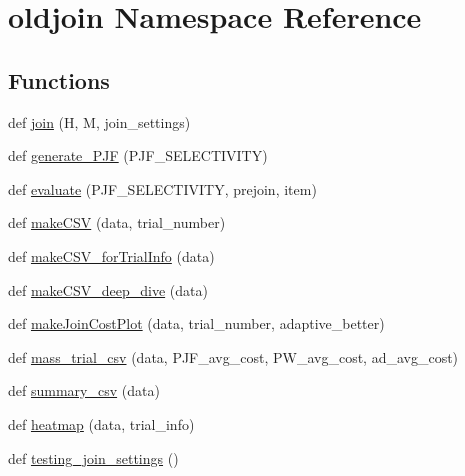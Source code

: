 \hypertarget{namespaceoldjoin}{}\section{oldjoin Namespace Reference}
\label{namespaceoldjoin}
\subsection*{Functions}
\begin{DoxyCompactItemize}
\item 
def \hyperlink{namespaceoldjoin_a8636d8a4fb507de47bd554ef95397533}{join} (H, M, join\+\_\+settings)
\item 
def \hyperlink{namespaceoldjoin_ab07f8db55282bc2c19e5c6ddbdfb820a}{generate\+\_\+\+P\+JF} (P\+J\+F\+\_\+\+S\+E\+L\+E\+C\+T\+I\+V\+I\+TY)
\item 
def \hyperlink{namespaceoldjoin_a8b76cd232f566a0726e27b9e31cdd045}{evaluate} (P\+J\+F\+\_\+\+S\+E\+L\+E\+C\+T\+I\+V\+I\+TY, prejoin, item)
\item 
def \hyperlink{namespaceoldjoin_ad2ce1a61d9eb32b5e5caedc2b9783a17}{make\+C\+SV} (data, trial\+\_\+number)
\item 
def \hyperlink{namespaceoldjoin_a57cd17251a242e4b70c053b463abc920}{make\+C\+S\+V\+\_\+for\+Trial\+Info} (data)
\item 
def \hyperlink{namespaceoldjoin_af8c01b7cf6d0ed355ba3bd5ce60b92fe}{make\+C\+S\+V\+\_\+deep\+\_\+dive} (data)
\item 
def \hyperlink{namespaceoldjoin_acd67830af4aecf91efa9c32ba4ad060a}{make\+Join\+Cost\+Plot} (data, trial\+\_\+number, adaptive\+\_\+better)
\item 
def \hyperlink{namespaceoldjoin_a3c1f060ef4b4343cdc4231fbccfeadb9}{mass\+\_\+trial\+\_\+csv} (data, P\+J\+F\+\_\+avg\+\_\+cost, P\+W\+\_\+avg\+\_\+cost, ad\+\_\+avg\+\_\+cost)
\item 
def \hyperlink{namespaceoldjoin_a7df1afa3b1e7e79e86d2db42e625ec70}{summary\+\_\+csv} (data)
\item 
def \hyperlink{namespaceoldjoin_ad1782de5b29177d53cd9ddf8972eee3c}{heatmap} (data, trial\+\_\+info)
\item 
def \hyperlink{namespaceoldjoin_ac193a15973e01b8bb951196afc933711}{testing\+\_\+join\+\_\+settings} ()
\end{DoxyCompactItemize}
